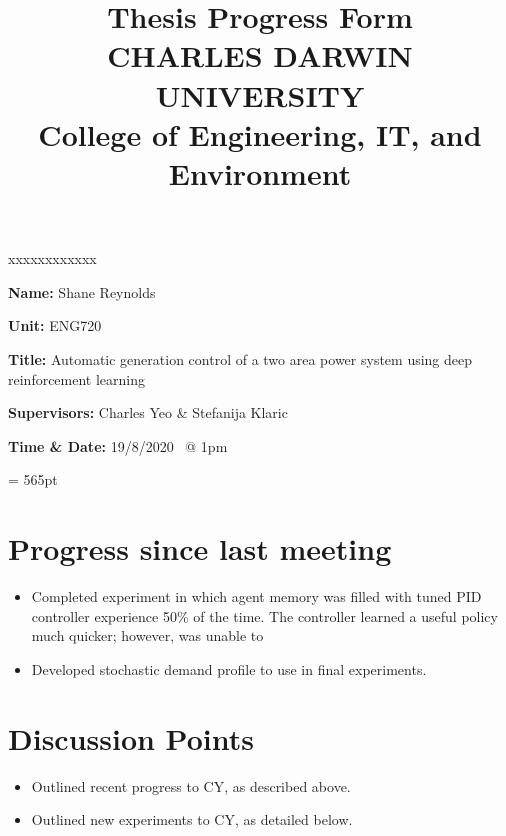 \documentclass[12pt]{article}
\title{	
		Thesis Progress Form\\
		CHARLES DARWIN UNIVERSITY\\
		College of Engineering, IT, and Environment
	  }
\author{}
\date{}
\begin{document}
	
	\maketitle
	
	\begin{namelist}{xxxxxxxxxxxx}
		\item[{\bf Name:}]
			Shane Reynolds
		\item[{\bf Unit:}]
			ENG720
		\item[{\bf Title:}]
			Automatic generation control of a two area power system using deep reinforcement learning
		\item[{\bf Supervisors:}]
			Charles Yeo \& Stefanija Klaric
		\item[{\bf Time \& Date:} 19/8/2020 \ @ 1pm]
			
	\end{namelist}
	
	\pagestyle{plain} %
	\textheight = 565pt %
	
	\section{Progress since last meeting}
	\begin{itemize}
		\item Completed experiment in which agent memory was filled with tuned PID controller experience 50\% of the time. The controller learned a useful policy much quicker; however, was unable to 
		\item Developed stochastic demand profile to use in final experiments.
	\end{itemize}
	\section{Discussion Points}
	\begin{itemize}
		\item Outlined recent progress to CY, as described above.
		\item Outlined new experiments to CY, as detailed below.
	\end{itemize}
\end{document}
